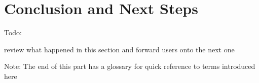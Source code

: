 \genHeader
\section{Conclusion and Next Steps}

\hypertarget{conclusion}{Todo:} review what happened in this section and forward users onto the next one

Note: The end of this part has a glossary for quick reference to terms introduced here
